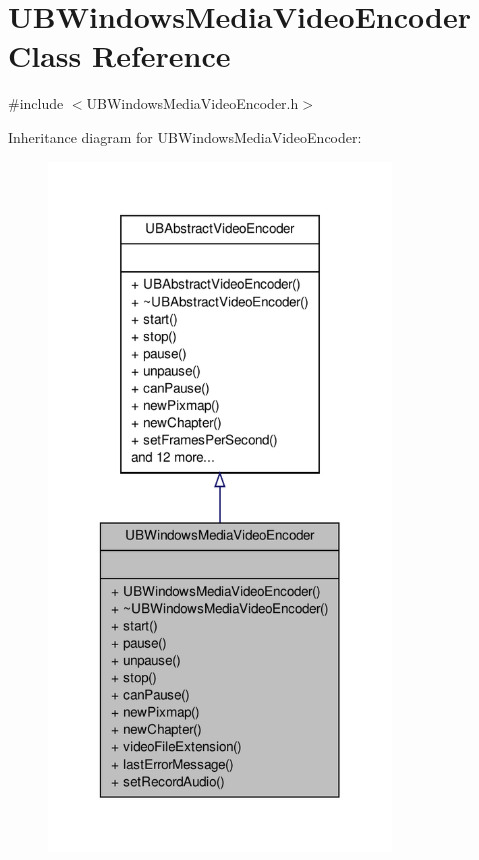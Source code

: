 \hypertarget{class_u_b_windows_media_video_encoder}{\section{U\-B\-Windows\-Media\-Video\-Encoder Class Reference}
\label{d0/d76/class_u_b_windows_media_video_encoder}
}


{\ttfamily \#include $<$U\-B\-Windows\-Media\-Video\-Encoder.\-h$>$}



Inheritance diagram for U\-B\-Windows\-Media\-Video\-Encoder\-:
\nopagebreak
\begin{figure}[H]
\begin{center}
\leavevmode
\includegraphics[width=258pt]{d6/d2c/class_u_b_windows_media_video_encoder__inherit__graph}
\end{center}
\end{figure}


